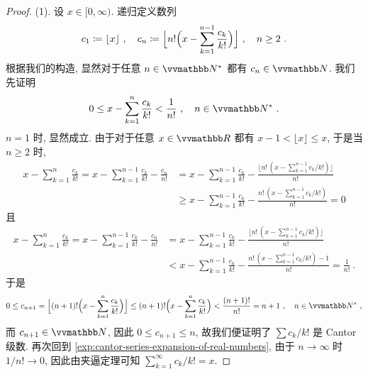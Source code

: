 \begin{proof}
    (1). 设 \(x \in [0, \infty)\). 递归定义数列
    \[
        c_1 \coloneqq \lfloor x \rfloor\ ,\quad c_n \coloneqq \Bigl\lfloor n! \Bigl(x - \sum_{k = 1}^{n - 1} \frac{c_k}{k!}\Bigr) \Bigr\rfloor\ ,\quad n \geq 2\ .
    \]
    根据我们的构造, 显然对于任意 \(n \in \N^\ast\) 都有 \(c_n \in \N\). 我们先证明
    \begin{align}\label{exp:cantor-series-expansion-of-real-numbers}
        0 \leq x - \sum_{k = 1}^n \frac{c_k}{k!} < \frac{1}{n!}\ ,\quad n \in \N^\ast\ .
    \end{align}
    \(n = 1\) 时, 显然成立. 由于对于任意 \(x \in \R\) 都有 \(x - 1 < \lfloor x \rfloor \leq x\), 于是当 \(n \geq 2\) 时,
    \begin{align*}
        x - \sum_{k = 1}^n \frac{c_k}{k!} = x - \sum_{k = 1}^{n - 1} \frac{c_k}{k!} - \frac{c_n}{n!} &= x - \sum_{k = 1}^{n - 1} \frac{c_k}{k!} - \frac{\lfloor n!\, (x - \sum_{k = 1}^{n - 1} c_k / k!) \rfloor}{n!}\\
        &\geq x - \sum_{k = 1}^{n - 1} \frac{c_k}{k!} - \frac{n!\, (x - \sum_{k = 1}^{n - 1} c_k / k!)}{n!} = 0
    \end{align*}
    且
    \begin{align*}
        x - \sum_{k = 1}^n \frac{c_k}{k!} = x - \sum_{k = 1}^{n - 1} \frac{c_k}{k!} - \frac{c_n}{n!} &= x - \sum_{k = 1}^{n - 1} \frac{c_k}{k!} - \frac{\lfloor n!\, (x - \sum_{k = 1}^{n - 1} c_k / k!) \rfloor}{n!}\\
        &< x - \sum_{k = 1}^{n - 1} \frac{c_k}{k!} - \frac{n!\, (x - \sum_{k = 1}^{n - 1} c_k / k!) - 1}{n!} = \frac{1}{n!}\ .
    \end{align*}
    于是
    \[
        0 \leq c_{n + 1} = \Bigl\lfloor (n + 1)! \Bigl(x - \sum_{k = 1}^n \frac{c_k}{k!}\Bigr) \Bigr\rfloor \leq (n + 1)! \Bigl(x - \sum_{k = 1}^n \frac{c_k}{k!}\Bigr) < \frac{(n + 1)!}{n!} = n + 1\ ,\quad n \in \N^\ast\ ,
    \]
    而 \(c_{n + 1} \in \N\), 因此 \(0 \leq c_{n + 1} \leq n\), 故我们便证明了 \(\sum c_k / k!\) 是 Cantor 级数. 再次回到 \eqref{exp:cantor-series-expansion-of-real-numbers}, 由于 \(n \to \infty\) 时 \(1 / n! \to 0\), 因此由夹逼定理可知 \(\sum_{k = 1}^\infty c_k / k! = x\).


\end{proof}

